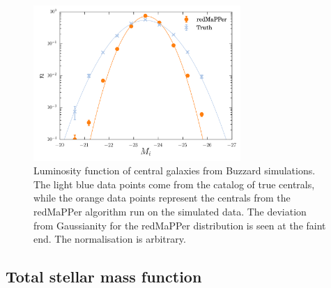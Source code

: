 {\begin{figure}\centering
\includegraphics[width=0.7\textwidth]{./chapters/chapter6/figs/Buzzard_truth_and_red_nocuts.png}
\caption{Luminosity function of central galaxies from Buzzard simulations. The light blue data points come from the catalog of true centrals, while the orange data points represent the centrals from the redMaPPer algorithm run on the simulated data. The deviation from Gaussianity for the redMaPPer distribution is seen at the faint end. The normalisation is arbitrary. }\label{fig:smfbuzzard}\end{figure}

\subsection{Total stellar mass function}

}
